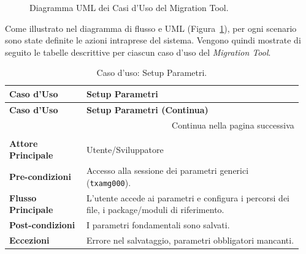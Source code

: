 \begin{figure}[H]
    \centering
    \caption{Diagramma UML dei Casi d'Uso del Migration Tool.}
    \label{fig:use_case}
\end{figure}

Come illustrato nel diagramma di flusso e UML (Figura~\ref{fig:use_case}), per ogni scenario sono state definite le azioni intraprese del sistema.
Vengono quindi mostrate di seguito le tabelle descrittive per ciascun caso d'uso del \textit{Migration Tool}.


\begin{longtable}{@{} p{0.25\linewidth} p{0.70\linewidth} @{}}
    \toprule
    \textbf{Caso d'Uso} & \textbf{Setup Parametri} \\
    \midrule
    \endfirsthead
    \toprule
    \textbf{Caso d'Uso} & \textbf{Setup Parametri (Continua)} \\
    \midrule
    \endhead
    \midrule
    \multicolumn{2}{r}{{Continua nella pagina successiva}} \\
    \bottomrule
    \endfoot
    \bottomrule
    \caption{Caso d'uso: Setup Parametri.} \label{tab:uc_setup_parametri} \\
    \endlastfoot
    \textbf{Attore Principale} & Utente/Sviluppatore \\
    \midrule
    \textbf{Pre-condizioni} & Accesso alla sessione dei parametri generici (\texttt{txamg000}). \\
    \midrule
    \textbf{Flusso Principale} & L'utente accede ai parametri e configura i percorsi dei file, i package/moduli di riferimento. \\
    \midrule
    \textbf{Post-condizioni}  & I parametri fondamentali sono salvati. \\
    \midrule
    \textbf{Eccezioni} & Errore nel salvataggio, parametri obbligatori mancanti. \\
\end{longtable}

